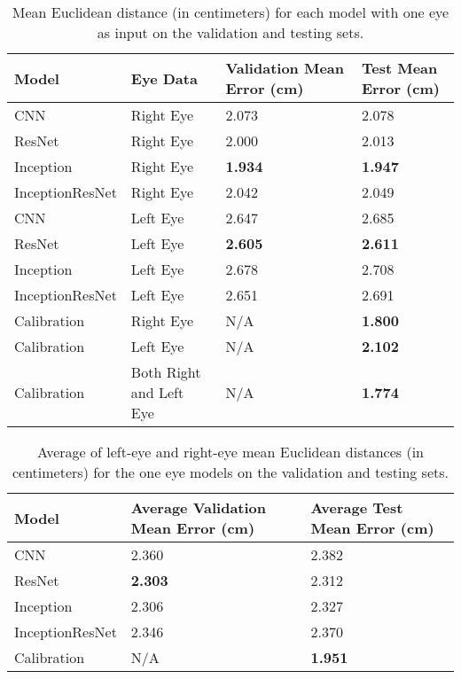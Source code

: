 \documentclass{article}
\begin{document}
\begin{table}
  \caption{Mean Euclidean distance (in centimeters) for each model with one eye as input on the validation and testing sets.}
  \centering
  \begin{tabular}{llll}
    \toprule
    Model     & Eye Data     & Validation Mean Error (cm)   & Test Mean Error (cm) \\
    \midrule
    CNN & Right Eye & 2.073 & 2.078 \\
    ResNet & Right Eye & 2.000 & 2.013 \\
    Inception & Right Eye & \textbf{1.934} & \textbf{1.947} \\
    InceptionResNet & Right Eye & 2.042 & 2.049 \\
    \midrule
    CNN & Left Eye & 2.647 & 2.685 \\
    ResNet & Left Eye & \textbf{2.605} & \textbf{2.611} \\
    Inception & Left Eye & 2.678 & 2.708 \\
    InceptionResNet & Left Eye & 2.651 & 2.691 \\
    \midrule
    Calibration & Right Eye & N/A & \textbf{1.800} \\
    Calibration & Left Eye & N/A & \textbf{2.102} \\
    Calibration & Both Right and Left Eye & N/A & \textbf{1.774} \\
    
    \bottomrule
  \end{tabular}
  \label{table:table2}
\end{table}

\begin{table}
  \caption{Average of left-eye and right-eye mean Euclidean distances (in centimeters) for the one eye models on the validation and testing sets.}
  \centering
  \begin{tabular}{lll}
    \toprule
    Model     & Average Validation Mean Error (cm)   & Average Test Mean Error (cm) \\
    \midrule
    CNN & 2.360 & 2.382 \\
    ResNet & \textbf{2.303} & 2.312 \\
    Inception & 2.306 & 2.327 \\
    InceptionResNet & 2.346 & 2.370 \\
    Calibration & N/A & \textbf{1.951} \\
    
    \bottomrule
  \end{tabular}
  \label{table:table3}
\end{table}
\end{document}
